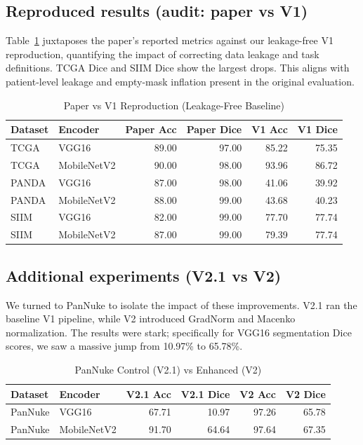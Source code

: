 \documentclass[conference,a4paper]{IEEEtran}
\begin{document}
\subsection{Reproduced results (audit: paper vs V1)}
Table~\ref{tab:audit} juxtaposes the paper's reported metrics against our leakage-free V1 reproduction, quantifying the impact of correcting data leakage and task definitions. TCGA Dice and SIIM Dice show the largest drops. This aligns with patient-level leakage and empty-mask inflation present in the original evaluation.
\begin{table}[t]
\centering
\caption{Paper vs V1 Reproduction (Leakage-Free Baseline)}
\label{tab:audit}
\begin{tabular}{l l r r r r}
\toprule
Dataset & Encoder & Paper Acc & Paper Dice & V1 Acc & V1 Dice \\
\midrule
TCGA & VGG16 & 89.00 & 97.00 & 85.22 & 75.35 \\
TCGA & MobileNetV2 & 90.00 & 98.00 & 93.96 & 86.72 \\
PANDA & VGG16 & 87.00 & 98.00 & 41.06 & 39.92 \\
PANDA & MobileNetV2 & 88.00 & 99.00 & 43.68 & 40.23 \\
SIIM & VGG16 & 82.00 & 99.00 & 77.70 & 77.74 \\
SIIM & MobileNetV2 & 87.00 & 99.00 & 79.39 & 77.74 \\
\bottomrule
\end{tabular}
\end{table}
\subsection{Additional experiments (V2.1 vs V2)}
We turned to PanNuke to isolate the impact of these improvements. V2.1 ran the baseline V1 pipeline, while V2 introduced GradNorm and Macenko normalization. The results were stark; specifically for VGG16 segmentation Dice scores, we saw a massive jump from 10.97\% to 65.78\%.
\begin{table}[t]
\centering
\caption{PanNuke Control (V2.1) vs Enhanced (V2)}
\label{tab:pannuke}
\begin{tabular}{l l r r r r}
\toprule
Dataset & Encoder & V2.1 Acc & V2.1 Dice & V2 Acc & V2 Dice \\
\midrule
PanNuke & VGG16 & 67.71 & 10.97 & 97.26 & 65.78 \\
PanNuke & MobileNetV2 & 91.70 & 64.64 & 97.64 & 67.35 \\
\bottomrule
\end{tabular}
\end{table}
\end{document}
